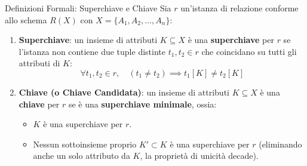 \documentclass[12pt]{extarticle}
\begin{document}
\begin{cbox}{Definizioni Formali: Superchiave e Chiave}
\noindent Sia $r$ un'istanza di relazione conforme allo schema $R(X)$ con $X = \{A_1, A_2, \dots, A_n\}$:
\begin{enumerate}
    \item \textbf{Superchiave}: un insieme di attributi $K \subseteq X$ è una \textbf{superchiave} per $r$ se l'istanza non contiene due tuple distinte $t_1, t_2 \in r$ che coincidano su tutti gli attributi di $K$:
    $$\forall t_1, t_2 \in r, \quad (t_1 \ne t_2) \implies t_1[K] \ne t_2[K]$$
    \item \textbf{Chiave (o Chiave Candidata)}: un insieme di attributi $K \subseteq X$ è una \textbf{chiave} per $r$ se è una \textbf{superchiave minimale}, ossia:
    \begin{itemize}
        \item $K$ è una superchiave per $r$.
        \item Nessun sottoinsieme proprio $K' \subset K$ è una superchiave per $r$ (eliminando anche un solo attributo da $K$, la proprietà di unicità decade).
    \end{itemize}
\end{enumerate}
\end{cbox}
\end{document}
